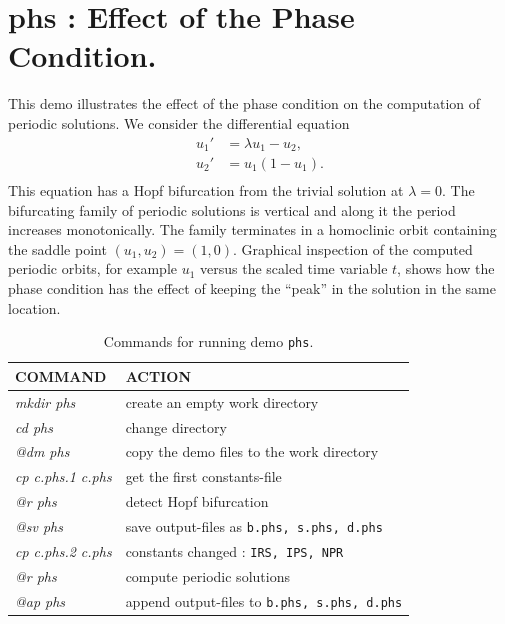 \documentclass[12pt]{report}
\begin{document}
\section{ phs : Effect of the Phase Condition.} \label{sec:Demos_phs}
This demo illustrates the effect of the phase condition 
on the computation of periodic solutions.
We consider the differential equation
\begin{equation} \begin{array}{cl}
 u_1'&= \lambda u_1 - u_2,  \\
 u_2'&= u_1 (1-u_1) .  \\
\end{array} \end{equation}
This equation has a Hopf bifurcation from the trivial solution at $\lambda=0$. 
The bifurcating family of periodic solutions
is vertical and along it the period increases monotonically.
The family terminates in a homoclinic orbit containing the
saddle point $(u_1,u_2)=(1,0)$.
Graphical inspection of the computed periodic orbits,
for example $u_1$ versus the scaled time variable $t$,
shows how the phase condition has the effect of keeping the ``peak'' 
in the solution in the same location.

\begin{table}[htbp]
\begin{center}
\begin{tabular}{| l | l |}
\hline
  COMMAND  & ACTION \\
\hline
  {\it mkdir phs} & create an empty work directory \\ 
  {\it cd phs} & change directory \\
  {\it @dm phs} & copy the demo files to the work directory \\
\hline
  {\it cp c.phs.1 c.phs} & get the first constants-file \\ 
  {\it @r phs} & detect Hopf bifurcation \\ 
  {\it @sv phs} & save output-files as {\tt b.phs, s.phs, d.phs} \\ 
\hline
  {\it cp c.phs.2 c.phs} & constants changed : {\tt IRS, IPS, NPR} \\ 
  {\it @r phs} & compute periodic solutions \\ 
  {\it @ap phs} & append output-files to {\tt b.phs, s.phs, d.phs} \\ 
\hline
\end{tabular}
\caption{Commands for running demo {\tt phs}.}
\label{tbl:demo_phs}
\end{center}
\end{table}
\end{document}
